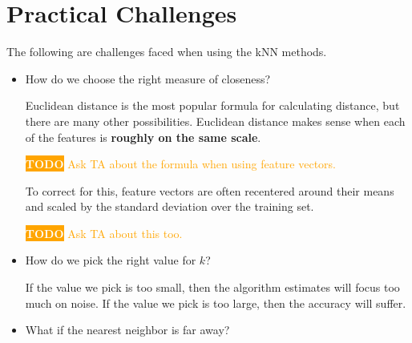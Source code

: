 \documentclass{report}
\newcommand{\todotext}[1]{\colorbox{orange}{\textcolor{white}{\textbf{TODO}}}}
\newcommand{\todo}[1]{\textsf{\todotext{} \textcolor{orange}{#1}}}
\begin{document}
\section{Practical Challenges}
The following are challenges faced when using the kNN methods.
\begin{itemize}
  \item How do we choose the right measure of closeness?
  
  Euclidean distance is the most popular formula for calculating distance, but
  there are many other possibilities. Euclidean distance makes sense
  when each of the features is \textbf{roughly on the same scale}.

  \todo{Ask TA about the formula when using feature vectors.}

  To correct for this, feature vectors are often recentered around their means
  and scaled by the standard deviation over the training set.
  
  \todo{Ask TA about this too.}

  \item How do we pick the right value for \(k\)?

  If the value we pick is too small, then the algorithm estimates will focus
  too much on noise. If the value we pick is too large, then the accuracy will suffer.

  \item What if the nearest neighbor is far away?
\end{itemize}
\end{document}
